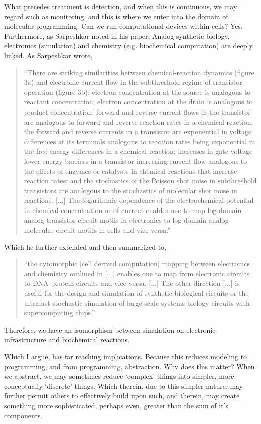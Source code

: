What precedes treatment is detection, and when this is continuous, we may regard such as monitoring, and this is where we enter into the domain of molecular programming. Can we run computational devices within cells? Yes. Furthermore, as Sarpeshkar noted in his paper, Analog synthetic biology, electronics (simulation) and chemistry (e.g. biochemical computation) are deeply linked. As Sarpeshkar wrote,
\begin{quotation}
    ``There are striking similarities between chemical-reaction dynamics (figure 3a) and electronic current flow in the subthreshold regime of transistor operation (figure 3b): electron concentration at the source is analogous to reactant concentration; electron concentration at the drain is analogous to product concentration; forward and reverse current flows in the transistor are analogous to forward and reverse reaction rates in a chemical reaction; the forward and reverse currents in a transistor are exponential in voltage differences at its terminals analogous to reaction rates being exponential in the free-energy differences in a chemical reaction; increases in gate voltage lower energy barriers in a transistor increasing current flow analogous to the effects of enzymes or catalysts in chemical reactions that increase reaction rates; and the stochastics of the Poisson shot noise in subthreshold transistors are analogous to the stochastics of molecular shot noise in reactions. [...] The logarithmic dependence of the electrochemical potential in chemical concentration or of current enables one to map log-domain analog transistor circuit motifs in electronics to log-domain analog molecular circuit motifs in cells and vice versa.''
\end{quotation}

Which he further extended and then summarized to, \begin{quotation}
    ``the cytomorphic [cell derived computation] mapping between electronics and chemistry outlined in [...] enables one to map from electronic circuits to DNA–protein circuits and vice versa. [...] The other direction [...] is useful for the design and simulation of synthetic biological circuits or the ultrafast stochastic simulation of large-scale systems-biology circuits with supercomputing chips.''
\end{quotation}

Therefore, we have an isomorphism between simulation on electronic infrastructure and biochemical reactions.

Which I argue, has far reaching implications. Because this reduces modeling to programming, and from programming, abstraction. Why does this matter? When we abstract, we may sometimes reduce `complex' things into simpler, more conceptually `discrete' things. Which therein, due to this simpler nature, may further permit others to effectively build upon such, and therein, may create something more sophisticated, perhaps even, greater than the sum of it's components.

